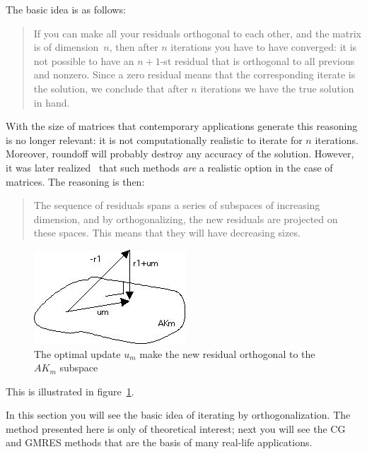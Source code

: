 The basic idea is as follows:
\begin{quote}
  If you can make all your residuals orthogonal to each other, and the
  matrix is of dimension~$n$, then after $n$ iterations you have to
  have converged: it is not possible to have an $n+1$-st residual that
  is orthogonal to all previous and nonzero. Since a zero residual
  means that the corresponding iterate is the solution, we conclude
  that after $n$ iterations we have the true solution in hand.
\end{quote}
With the size of matrices that contemporary applications generate this
reasoning is no longer relevant: it is not computationally realistic
to iterate for $n$ iterations. Moreover, roundoff will probably destroy any
accuracy of the solution.
%
However, it was later realized~\cite{Reid1971:cg} that such methods
\emph{are} a realistic option in the case of  matrices. The
reasoning is then:
\begin{quote}
  The sequence of residuals spans a series of subspaces of increasing
  dimension, and by orthogonalizing, the new residuals are projected on
  these spaces. This means that they will have decreasing sizes.
\end{quote}
\begin{figure}[ht]
  \includegraphics[scale=.7]{graphics-public/projection}
  \caption{The optimal update $u_m$ make the new residual orthogonal to
    the $AK_m$ subspace}
  \label{fig:res-projection}
\end{figure}
This is illustrated in figure~\ref{fig:res-projection}.

In this section you will see the basic idea of iterating by
orthogonalization. The method presented here is only of theoretical
interest; next you will see the \acf{CG} and \acf{GMRES} methods that
are the basis of many real-life applications.

